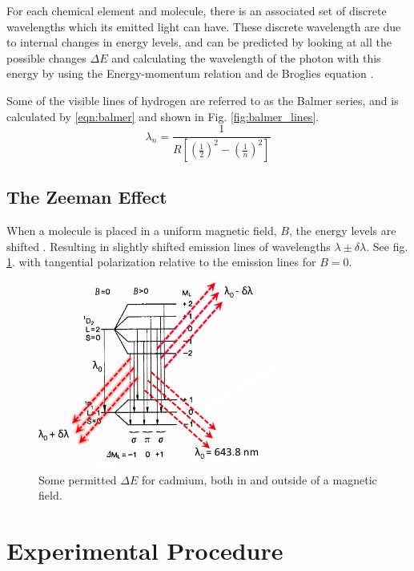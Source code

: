 \documentclass[11pt,a4paper]{article}
\begin{document}
      For each chemical element and molecule, there is an associated set of discrete wavelengths  which its emitted light can have. These discrete wavelength are due to internal changes in energy levels, and can be predicted by looking at all the possible changes $\Delta E$ and calculating the wavelength of the photon with this energy by using the Energy-momentum relation \cite{wiki:energy_momentum} and de Broglies equation \cite{wiki:debroglie}.

      Some of the visible lines of hydrogen are referred to as the Balmer series, and is calculated by \ref{eqn:balmer} and shown in Fig. \ref{fig:balmer_lines}.
      \begin{equation}
         \lambda_n = \frac{1}{R \left[ \left(\frac{1}{2}\right)^2 - \left(\frac{1}{n}\right)^2 \right]} 
         \label{eqn:balmer}
      \end{equation}

    \subsection{The Zeeman Effect}
      When a molecule is placed in a uniform magnetic field, $B$, the energy levels are shifted \cite{griffiths}. Resulting in slightly shifted emission lines of wavelengths $\lambda \pm \delta \lambda$. See fig. \ref{fig:zeeman_energy}. with tangential polarization relative to the emission lines for $B=0$.

      \begin{figure}[H]
        \center 
        \includegraphics[width=8cm]{scripts/figs/ZEEMAN_ENERGYLEVELS.jpg}
        \caption{Some permitted $\Delta E$ for cadmium, both in and outside of a magnetic field.}
        \label{fig:zeeman_energy}
      \end{figure}


\section{\label{section:experimental}Experimental Procedure} 
\end{document}
